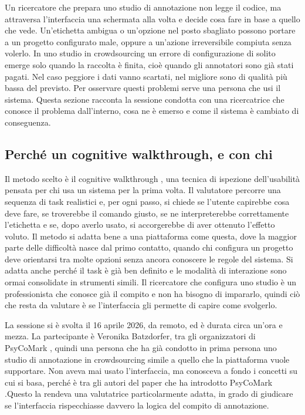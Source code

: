 \documentclass[]{sapthesis}
\begin{document}
Un ricercatore che prepara uno studio di annotazione non legge il codice, ma attraversa l'interfaccia una schermata alla volta e decide cosa fare in base a quello che vede. Un'etichetta ambigua o un'opzione nel posto sbagliato possono portare a un progetto configurato male, oppure a un'azione irreversibile compiuta senza volerlo. In uno studio in crowdsourcing un errore di configurazione di solito emerge solo quando la raccolta è finita, cioè quando gli annotatori sono già stati pagati. Nel caso peggiore i dati vanno scartati, nel migliore sono di qualità più bassa del previsto. Per osservare questi problemi serve una persona che usi il sistema. Questa sezione racconta la sessione condotta con una ricercatrice che conosce il problema dall'interno, cosa ne è emerso e come il sistema è cambiato di conseguenza.

\subsection{Perché un cognitive walkthrough, e con chi}
\label{subsec:walkthrough-setting}

Il metodo scelto è il cognitive walkthrough \parencite{wharton1994cognitive}, una tecnica di ispezione dell'usabilità pensata per chi usa un sistema per la prima volta. Il valutatore percorre una sequenza di task realistici e, per ogni passo, si chiede se l'utente capirebbe cosa deve fare, se troverebbe il comando giusto, se ne interpreterebbe correttamente l'etichetta e se, dopo averlo usato, si accorgerebbe di aver ottenuto l'effetto voluto. Il metodo si adatta bene a una piattaforma come questa, dove la maggior parte delle difficoltà nasce dal primo contatto, quando chi configura un progetto deve orientarsi tra molte opzioni senza ancora conoscere le regole del sistema. Si adatta anche perché il task è già ben definito e le modalità di interazione sono ormai consolidate in strumenti simili. Il ricercatore che configura uno studio è un professionista che conosce già il compito e non ha bisogno di impararlo, quindi ciò che resta da valutare è se l'interfaccia gli permette di capire come svolgerlo.

La sessione si è svolta il 16 aprile 2026, da remoto, ed è durata circa un'ora e mezza. La partecipante è Veronika Batzdorfer, tra gli organizzatori di PsyCoMark \parencite{samory2026psycomark}, quindi una persona che ha già condotto in prima persona uno studio di annotazione in crowdsourcing simile a quello che la piattaforma vuole supportare. Non aveva mai usato l'interfaccia, ma conosceva a fondo i concetti su cui si basa, perché è tra gli autori del paper che ha introdotto PsyCoMark \parencite{samory2026psycomark}.Questo la rendeva una valutatrice particolarmente adatta, in grado di giudicare se l'interfaccia rispecchiasse davvero la logica del compito di annotazione.
\end{document}
